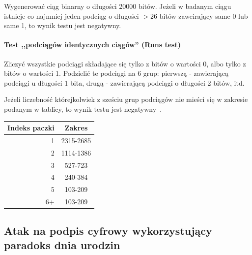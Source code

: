 \documentclass[wi]{zut}
\begin{document}
Wygenerować ciąg binarny o długości 20000 bitów.  Jeżeli w badanym ciągu istnieje co najmniej jeden podciąg o długości $>26$ bitów zaweirający same 0 lub same 1, to wynik testu jest negatywny.

\paragraph{Test ,,podciągów identycznych ciągów'' (Runs test)}

Zliczyć wszystkie podciągi składające się tylko z bitów o wartości 0, albo tylko z bitów o wartości 1. Podzielić te podciągi na 6 grup: pierwszą - zawierającą podciągi u długości 1 bita, drugą - zawierającą podciągi o długości 2 bitów, itd.

Jeżeli liczebność którejkolwiek z sześciu grup podciągów nie mieści się w zakresie podanym w tablicy, to wynik testu jest negatywny~\cite{Chocian2020_2}.

\begin{table}[H]
\centering
\begin{tabular}{@{}rc@{}}
\toprule
Indeks paczki & Zakres    \\ \midrule
1             & 2315-2685 \\
2             & 1114-1386 \\
3             & 527-723   \\
4             & 240-384   \\
5             & 103-209   \\
6+            & 103-209   \\ \bottomrule
\end{tabular}
\end{table}




\subsection{Atak na podpis cyfrowy wykorzystujący paradoks dnia urodzin}
\end{document}
